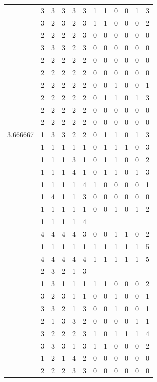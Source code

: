 \documentclass[]{book}
\theoremstyle{definition}
\theoremstyle{definition}
\theoremstyle{definition}
\theoremstyle{remark}
\begin{document}
\begin{table}
{\begin{tabular}[t]{rrrrrrrrrrrr}
 & 3 & 3 & 3 & 3 & 3 & 1 & 1 & 0 & 0 & 1 & 3\\
 & 3 & 2 & 3 & 2 & 3 & 1 & 1 & 0 & 0 & 0 & 2\\
 & 2 & 2 & 2 & 2 & 3 & 0 & 0 & 0 & 0 & 0 & 0\\
 & 3 & 3 & 3 & 2 & 3 & 0 & 0 & 0 & 0 & 0 & 0\\
 & 2 & 2 & 2 & 2 & 2 & 0 & 0 & 0 & 0 & 0 & 0\\
 & 2 & 2 & 2 & 2 & 2 & 0 & 0 & 0 & 0 & 0 & 0\\
 & 2 & 2 & 2 & 2 & 2 & 0 & 0 & 1 & 0 & 0 & 1\\
 & 2 & 2 & 2 & 2 & 2 & 0 & 1 & 1 & 0 & 1 & 3\\
 & 2 & 2 & 2 & 2 & 2 & 0 & 0 & 0 & 0 & 0 & 0\\
 & 2 & 2 & 2 & 2 & 2 & 0 & 0 & 0 & 0 & 0 & 0\\
3.666667 & 1 & 3 & 3 & 2 & 2 & 0 & 1 & 1 & 0 & 1 & 3\\
 & 1 & 1 & 1 & 1 & 1 & 0 & 1 & 1 & 1 & 0 & 3\\
 & 1 & 1 & 1 & 3 & 1 & 0 & 1 & 1 & 0 & 0 & 2\\
 & 1 & 1 & 1 & 4 & 1 & 0 & 1 & 1 & 0 & 1 & 3\\
 & 1 & 1 & 1 & 1 & 4 & 1 & 0 & 0 & 0 & 0 & 1\\
 & 1 & 4 & 1 & 1 & 3 & 0 & 0 & 0 & 0 & 0 & 0\\
 & 1 & 1 & 1 & 1 & 1 & 0 & 0 & 1 & 0 & 1 & 2\\
 & 1 & 1 & 1 & 1 & 4 &  &  &  &  &  & \\
 & 4 & 4 & 4 & 4 & 3 & 0 & 0 & 1 & 1 & 0 & 2\\
 & 1 & 1 & 1 & 1 & 1 & 1 & 1 & 1 & 1 & 1 & 5\\
 & 4 & 4 & 4 & 4 & 4 & 1 & 1 & 1 & 1 & 1 & 5\\
 & 2 & 3 & 2 & 1 & 3 &  &  &  &  &  & \\
 & 1 & 3 & 1 & 1 & 1 & 1 & 1 & 0 & 0 & 0 & 2\\
 & 3 & 2 & 3 & 1 & 1 & 0 & 0 & 1 & 0 & 0 & 1\\
 & 3 & 3 & 2 & 1 & 3 & 0 & 0 & 1 & 0 & 0 & 1\\
 & 2 & 1 & 3 & 3 & 2 & 0 & 0 & 0 & 0 & 1 & 1\\
 & 3 & 2 & 2 & 2 & 3 & 1 & 0 & 1 & 1 & 1 & 4\\
 & 3 & 3 & 3 & 1 & 3 & 1 & 1 & 0 & 0 & 0 & 2\\
 & 1 & 2 & 1 & 4 & 2 & 0 & 0 & 0 & 0 & 0 & 0\\
 & 2 & 2 & 2 & 3 & 3 & 0 & 0 & 0 & 0 & 0 & 0\\

\end{tabular}}
\end{table}
\end{document}
